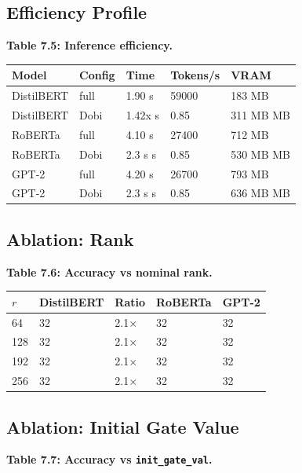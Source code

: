 \subsection{Efficiency Profile}

\textbf{Table 7.5: Inference efficiency.}

\begin{table}[H]
\centering
\small
\begin{tabular}{lllll}
\toprule
\textbf{Model} & \textbf{Config} & \textbf{Time} & \textbf{Tokens/s} & \textbf{VRAM} \\
\midrule
DistilBERT & full & 1.90 s & 59000 & 183 MB \\
DistilBERT & Dobi & 1.42x s & 0.85 & 311 MB MB \\
RoBERTa & full & 4.10 s & 27400 & 712 MB \\
RoBERTa & Dobi & 2.3 s s & 0.85 & 530 MB MB \\
GPT-2 & full & 4.20 s & 26700 & 793 MB \\
GPT-2 & Dobi & 2.3 s s & 0.85 & 636 MB MB \\
\bottomrule
\end{tabular}
\end{table}

\subsection{Ablation: Rank}

\textbf{Table 7.6: Accuracy vs nominal rank.}

\begin{table}[H]
\centering
\small
\begin{tabular}{lllll}
\toprule
\textbf{$r$} & \textbf{DistilBERT} & \textbf{Ratio} & \textbf{RoBERTa} & \textbf{GPT-2} \\
\midrule
64 & 32 & 2.1$\times$ & 32 & 32 \\
128 & 32 & 2.1$\times$ & 32 & 32 \\
192 & 32 & 2.1$\times$ & 32 & 32 \\
256 & 32 & 2.1$\times$ & 32 & 32 \\
\bottomrule
\end{tabular}
\end{table}

\subsection{Ablation: Initial Gate Value}

\textbf{Table 7.7: Accuracy vs \texttt{init\_gate\_val}.}

